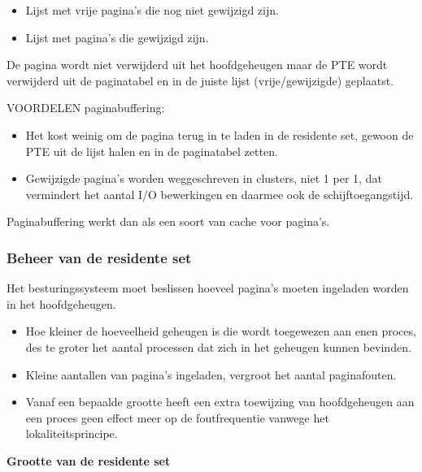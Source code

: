 \begin{itemize}
\item Lijst met vrije pagina’s die nog niet gewijzigd zijn.
\item Lijst met pagina’s die gewijzigd zijn.
\end{itemize}

De pagina wordt niet verwijderd uit het hoofdgeheugen maar de PTE wordt verwijderd uit de paginatabel en in de juiste lijst (vrije/gewijzigde) geplaatst.

VOORDELEN paginabuffering:


\begin{itemize}
\item Het kost weinig om de pagina terug in te laden in de residente set, gewoon de PTE uit de lijst halen en in de paginatabel zetten.
\item Gewijzigde pagina's worden weggeschreven in clusters, niet 1 per 1, dat vermindert het aantal I/O bewerkingen en daarmee ook de schijftoegangstijd.
\end{itemize}


Paginabuffering werkt dan als een soort van cache voor pagina's.


\subsubsection{Beheer van de residente set}

Het besturingssysteem moet beslissen hoeveel pagina’s moeten ingeladen worden in het hoofdgeheugen.

\begin{itemize}
\item Hoe kleiner de hoeveelheid geheugen is die wordt toegewezen aan enen proces, des te groter het aantal processen dat zich in het geheugen kunnen bevinden.
\item Kleine aantallen van pagina’s ingeladen, vergroot het aantal paginafouten.
\item Vanaf een bepaalde grootte heeft een extra toewijzing van hoofdgeheugen aan een proces geen effect meer op de foutfrequentie vanwege het lokaliteitsprincipe.
\end{itemize}

\textbf{Grootte van de residente set}

